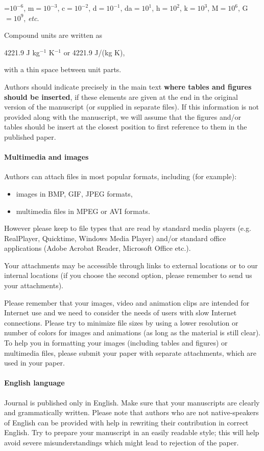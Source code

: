 \documentclass[USenglish,oneside,twocolumn]{article}
\begin{document}
\begin{center}
    \textmu=$10^{-6}$, m$=10^{-3}$, c$=10^{-2}$, d$=10^{-1}$,
    da$=10^1$, h$=10^2$, k$=10^3$, M$=10^6$, G$=10^9$, {\em etc}.
\end{center}

Compound units are written as
\begin{center}
    4221.9 J kg$^{-1}$ K$^{-1}$ or 4221.9 J/(kg K),
\end{center}
with a thin space between unit parts.


Authors should indicate precisely in the main text {\bf where tables and figures should be inserted}, if these elements are given at the end in the original version of the manuscript (or supplied in separate files).
If this information is not provided along with the manuscript, we will assume that the figures and/or tables should be insert at the closest position to first reference to them in the published paper.

\paragraph{Multimedia and images}
Authors can attach files in most popular formats, including (for example):
\begin{itemize}
    \item images in BMP, GIF, JPEG formats,
    \item multimedia files in MPEG or AVI formats.
\end{itemize}

However please keep to file types that are read by standard media players (e.g. RealPlayer, Quicktime, Windows Media Player) and/or standard office applications (Adobe Acrobat Reader, Microsoft Office etc.).

Your attachments may be accessible through links to external locations or to our internal locations (if you choose the second option, please remember to send us your attachments).

Please remember that your images, video and animation clips are intended for Internet use and we need to consider the needs of users with slow Internet connections. Please try to minimize file sizes by using a lower resolution or number of colors for images and animations (as long as the material is still clear). To help you in formatting your images (including tables and figures) or multimedia files, please submit your paper with separate attachments, which are used in your paper.

\paragraph{English language}
Journal     is published only in English. Make sure that your manuscripts are clearly and grammatically written. Please note that authors who are not native-speakers of English can be provided with help in rewriting their contribution in correct English. Try to prepare your manuscript in an easily readable style; this will help avoid severe misunderstandings which might lead to rejection of the paper.
\end{document}
